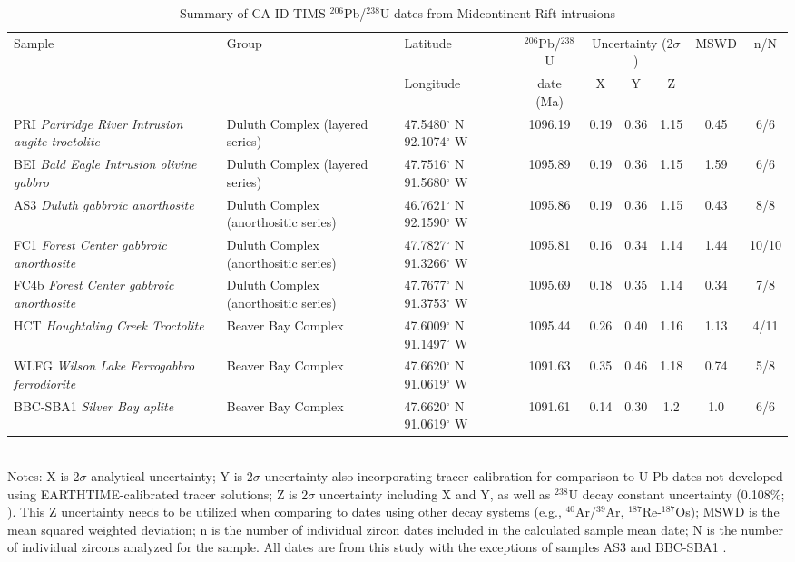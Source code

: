 \documentclass[11pt,letterpaper]{article}
\begin{document}
\begin{table}[h!]
\footnotesize
\caption{Summary of CA-ID-TIMS $^{206}$Pb/$^{238}$U dates from Midcontinent Rift intrusions}
\begin{tabular}{|p{3.2 cm}|p{2.4 cm}|p{1.8 cm}|c|ccc|c|c|}
\hline
Sample & Group & Latitude & $^{206}$Pb/$^{238}$U & \multicolumn{3}{|c|}{Uncertainty (2$\sigma$)} & MSWD & n/N \\
 &  & Longitude & date (Ma) & X & Y & Z & & \\
\hline
PRI \textit{Partridge River Intrusion augite troctolite} & Duluth Complex (layered series) & 47.5480$^{\circ}$ N 92.1074$^{\circ}$ W & 1096.19 & 0.19 & 0.36 & 1.15 & 0.45 & 6/6 \\
\hline
BEI \textit{Bald Eagle Intrusion olivine gabbro} & Duluth Complex (layered series) & 47.7516$^{\circ}$ N 91.5680$^{\circ}$ W & 1095.89 & 0.19 & 0.36 & 1.15 & 1.59 & 6/6 \\
\hline
AS3 \textit{Duluth gabbroic anorthosite} & Duluth Complex (anorthositic series) & 46.7621$^{\circ}$ N 92.1590$^{\circ}$ W & 1095.86 & 0.19 & 0.36 & 1.15 & 0.43 & 8/8 \\
\hline
FC1 \textit{Forest Center gabbroic anorthosite} & Duluth Complex (anorthositic series) & 47.7827$^{\circ}$ N 91.3266$^{\circ}$ W & 1095.81 & 0.16 & 0.34 & 1.14 & 1.44 & 10/10 \\
\hline
FC4b \textit{Forest Center gabbroic anorthosite} & Duluth Complex (anorthositic series) & 47.7677$^{\circ}$ N 91.3753$^{\circ}$ W & 1095.69 & 0.18 & 0.35 & 1.14 & 0.34 & 7/8 \\
\hline
HCT \textit{Houghtaling Creek Troctolite} & Beaver Bay Complex & 47.6009$^{\circ}$ N 91.1497$^{\circ}$ W & 1095.44 & 0.26 & 0.40 & 1.16 & 1.13 & 4/11  \\
\hline
WLFG \textit{Wilson Lake Ferrogabbro ferrodiorite} & Beaver Bay Complex & 47.6620$^{\circ}$ N 91.0619$^{\circ}$ W & 1091.63 & 0.35 & 0.46 & 1.18 & 0.74 & 5/8 \\
\hline
BBC-SBA1 \textit{Silver Bay aplite} & Beaver Bay Complex & 47.6620$^{\circ}$ N 91.0619$^{\circ}$ W & 1091.61 & 0.14 & 0.30 & 1.2 & 1.0 & 6/6 \\
\hline
\end{tabular}\\
Notes: X is 2$\sigma$ analytical uncertainty; Y is 2$\sigma$ uncertainty also incorporating tracer calibration for comparison to U-Pb dates not developed using EARTHTIME-calibrated tracer solutions; Z is 2$\sigma$ uncertainty including X and Y, as well as $^{238}$U decay constant uncertainty (0.108$\%$; \citealp{Jaffey1971a}). This Z uncertainty needs to be utilized when comparing to dates using other decay systems (e.g., $^{40}$Ar/$^{39}$Ar, $^{187}$Re-$^{187}$Os); MSWD is the mean squared weighted deviation; n is the number of individual zircon dates included in the calculated sample mean date; N is the number of individual zircons analyzed for the sample. All dates are from this study with the exceptions of samples AS3 \citep{Schoene2006a} and BBC-SBA1 \citep{Fairchild2017a}.
\label{tab:geochron}
\end{table}
\end{document}
